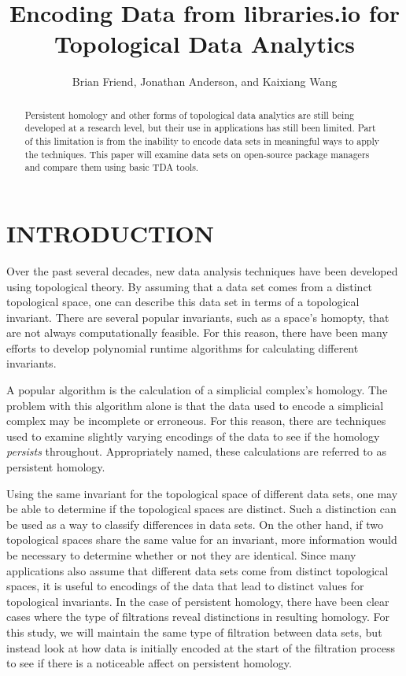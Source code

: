 \documentclass[letterpaper, 10 pt, conference]{ieeeconf}  %
\title{\LARGE \bf Encoding Data from libraries.io for Topological Data Analytics}
\author{Brian Friend, Jonathan Anderson, and Kaixiang Wang}
\begin{document}
\maketitle
\thispagestyle{empty}
\pagestyle{empty}


\begin{abstract}

Persistent homology and other forms of topological data analytics are still being developed at a research level, but their use in applications has still been limited. Part of this limitation is from the inability to encode data sets in meaningful ways to apply the techniques. This paper will examine data sets on open-source package managers and compare them using basic TDA tools.

\end{abstract}


\section{INTRODUCTION}

Over the past several decades, new data analysis techniques have been developed using topological theory. By assuming that a data set comes from a distinct topological space, one can describe this data set in terms of a topological invariant. There are several popular invariants, such as a space's homopty, that are not always computationally feasible. For this reason, there have been many efforts to develop polynomial runtime algorithms for calculating different invariants.

A popular algorithm is the calculation of a simplicial complex's homology. The problem with this algorithm alone is that the data used to encode a simplicial complex may be incomplete or erroneous. For this reason, there are techniques used to examine slightly varying encodings of the data to see if the homology {\it persists} throughout. Appropriately named, these calculations are referred to as persistent homology.

Using the same invariant for the topological space of different data sets, one may be able to determine if the topological spaces are distinct. Such a distinction can be used as a way to classify differences in data sets. On the other hand, if two topological spaces share the same value for an invariant, more information would be necessary to determine whether or not they are identical. Since many applications also assume that different data sets come from distinct topological spaces, it is useful to encodings of the data that lead to distinct values for topological invariants. In the case of persistent homology, there have been clear cases where the type of filtrations reveal distinctions in resulting homology. For this study, we will maintain the same type of filtration between data sets, but instead look at how data is initially encoded at the start of the filtration process to see if there is a noticeable affect on persistent homology.
\end{document}
